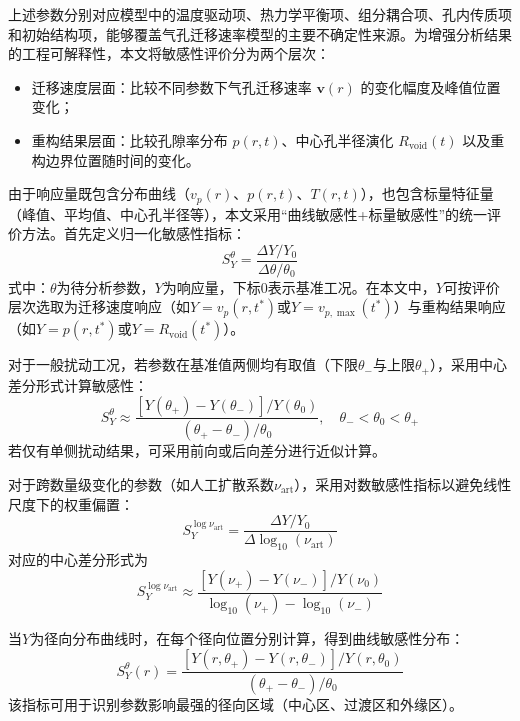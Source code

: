 上述参数分别对应模型中的温度驱动项、热力学平衡项、组分耦合项、孔内传质项和初始结构项，能够覆盖气孔迁移速率模型的主要不确定性来源。为增强分析结果的工程可解释性，本文将敏感性评价分为两个层次：
\begin{itemize}
	\item 迁移速度层面：比较不同参数下气孔迁移速率 $\boldsymbol{v}(r)$ 的变化幅度及峰值位置变化；
	\item 重构结果层面：比较孔隙率分布 $p(r,t)$、中心孔半径演化 $R_{\mathrm{void}}(t)$ 以及重构边界位置随时间的变化。
\end{itemize}

由于响应量既包含分布曲线（$v_p(r)$、$p(r,t)$、$T(r,t)$），也包含标量特征量（峰值、平均值、中心孔半径等），本文采用“曲线敏感性+标量敏感性”的统一评价方法。首先定义归一化敏感性指标：
\begin{equation}
	S_Y^\theta = \frac{\Delta Y / Y_0}{\Delta \theta / \theta_0}
	\label{eq:sensitivity_definition}
\end{equation}
式中：$\theta$为待分析参数，$Y$为响应量，下标$0$表示基准工况。在本文中，$Y$可按评价层次选取为迁移速度响应（如$Y=v_p(r,t^*)$或$Y=v_{p,\max}(t^*)$）与重构结果响应（如$Y=p(r,t^*)$或$Y=R_{\mathrm{void}}(t^*)$）。

对于一般扰动工况，若参数在基准值两侧均有取值（下限$\theta_-$与上限$\theta_+$），采用中心差分形式计算敏感性：
\begin{equation}
	S_Y^{\theta}\approx
	\frac{\left[Y(\theta_+)-Y(\theta_-)\right]/Y(\theta_0)}{\left(\theta_+-\theta_-\right)/\theta_0},
	\quad \theta_-<\theta_0<\theta_+
\end{equation}
若仅有单侧扰动结果，可采用前向或后向差分进行近似计算。

对于跨数量级变化的参数（如人工扩散系数$\nu_{\mathrm{art}}$），采用对数敏感性指标以避免线性尺度下的权重偏置：
\begin{equation}
	S_Y^{\log \nu_{\mathrm{art}}}=
	\frac{\Delta Y/Y_0}{\Delta \log_{10}(\nu_{\mathrm{art}})}
\end{equation}
对应的中心差分形式为
\begin{equation}
	S_Y^{\log \nu_{\mathrm{art}}}\approx
	\frac{\left[Y(\nu_+)-Y(\nu_-)\right]/Y(\nu_0)}{\log_{10}(\nu_+)-\log_{10}(\nu_-)}
\end{equation}

当$Y$为径向分布曲线时，在每个径向位置分别计算，得到曲线敏感性分布：
\begin{equation}
	S_Y^{\theta}(r)=
	\frac{\left[Y(r,\theta_+)-Y(r,\theta_-)\right]/Y(r,\theta_0)}{\left(\theta_+-\theta_-\right)/\theta_0}
\end{equation}
该指标可用于识别参数影响最强的径向区域（中心区、过渡区和外缘区）。


